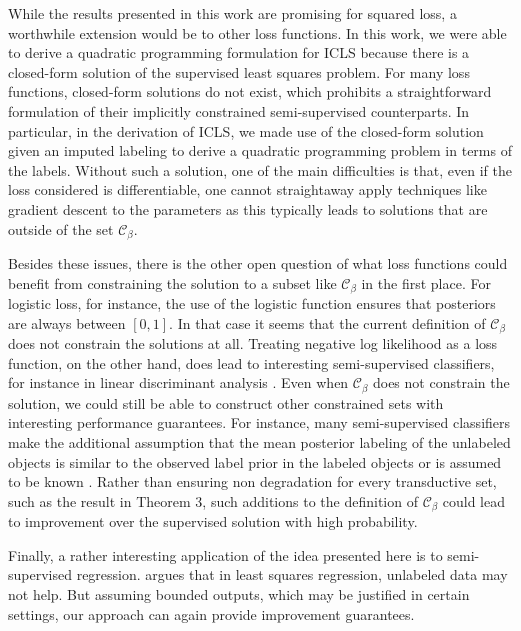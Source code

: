 \documentclass{elsarticle}
\newcommand{\Cb}{\mathcal{C}_{\beta}}
\begin{document}
While the results presented in this work are promising for squared loss, a worthwhile extension would be to other loss functions. In this work, we were able to derive a quadratic programming formulation for ICLS because there is a closed-form solution of the supervised least squares problem. For many loss functions, closed-form solutions do not exist, which prohibits a straightforward formulation of their implicitly constrained semi-supervised counterparts. In particular, in the derivation of ICLS, we made use of the closed-form solution given an imputed labeling to derive a quadratic programming problem in terms of the labels. Without such a solution, one of the main difficulties is that, even if the loss considered is differentiable, one cannot straightaway apply techniques like gradient descent to the parameters as this typically leads to solutions that are outside of the set $\Cb$. 

Besides these issues, there is the other open question of what loss functions could benefit from constraining the solution to a subset like $\Cb$ in the first place. For logistic loss, for instance, the use of the logistic function ensures that posteriors are always between $[0,1]$. In that case it seems that the current definition of $\Cb$ does not constrain the solutions at all. Treating negative log likelihood as a loss function, on the other hand, does lead to interesting semi-supervised classifiers, for instance in linear discriminant analysis \cite{Krijthe2014}. Even when $\Cb$ does not constrain the solution, we could still be able to construct other constrained sets with interesting performance guarantees. For instance, many semi-supervised classifiers make the additional assumption that the mean posterior labeling of the unlabeled objects is similar to the observed label prior in the labeled objects \cite{Joachims1999,Collobert2006} or is assumed to be known \cite{Mann2010}. Rather than ensuring non degradation for every transductive set, such as the result in Theorem 3, such additions to the definition of $\Cb$ could lead to improvement over the supervised solution with high probability.

Finally, a rather interesting application of the idea presented here is to semi-supervised regression. \cite{Culp2008} argues that in least squares regression, unlabeled data may not help. But assuming bounded outputs, which may be justified in certain settings, our approach can again provide improvement guarantees.
\end{document}
